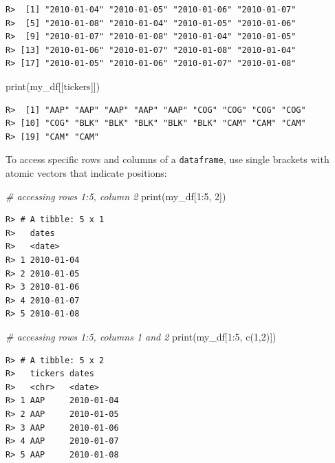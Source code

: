\documentclass[
  12pt,
]{book}
\newenvironment{Shaded}{\begin{snugshade}}{\end{snugshade}}
\newcommand{\CommentTok}[1]{\textcolor[rgb]{0.37,0.37,0.37}{\textit{#1}}}
\newcommand{\DecValTok}[1]{\textcolor[rgb]{0.06,0.06,0.06}{#1}}
\newcommand{\FunctionTok}[1]{\textcolor[rgb]{0,0,0}{#1}}
\newcommand{\NormalTok}[1]{#1}
\newcommand{\SpecialCharTok}[1]{\textcolor[rgb]{0,0,0}{#1}}
\newcommand{\StringTok}[1]{\textcolor[rgb]{0.5,0.5,0.5}{#1}}
\begin{document}
\begin{verbatim}
R>  [1] "2010-01-04" "2010-01-05" "2010-01-06" "2010-01-07"
R>  [5] "2010-01-08" "2010-01-04" "2010-01-05" "2010-01-06"
R>  [9] "2010-01-07" "2010-01-08" "2010-01-04" "2010-01-05"
R> [13] "2010-01-06" "2010-01-07" "2010-01-08" "2010-01-04"
R> [17] "2010-01-05" "2010-01-06" "2010-01-07" "2010-01-08"
\end{verbatim}

\begin{Shaded}
\begin{Highlighting}[]
\FunctionTok{print}\NormalTok{(my\_df[[}\StringTok{\textquotesingle{}tickers\textquotesingle{}}\NormalTok{]])}
\end{Highlighting}
\end{Shaded}

\begin{verbatim}
R>  [1] "AAP" "AAP" "AAP" "AAP" "AAP" "COG" "COG" "COG" "COG"
R> [10] "COG" "BLK" "BLK" "BLK" "BLK" "BLK" "CAM" "CAM" "CAM"
R> [19] "CAM" "CAM"
\end{verbatim}

To access specific rows and columns of a \texttt{dataframe}, use single brackets with atomic vectors that indicate positions:

\begin{Shaded}
\begin{Highlighting}[]
\CommentTok{\# accessing rows 1:5, column 2}
\FunctionTok{print}\NormalTok{(my\_df[}\DecValTok{1}\SpecialCharTok{:}\DecValTok{5}\NormalTok{, }\DecValTok{2}\NormalTok{])}
\end{Highlighting}
\end{Shaded}

\begin{verbatim}
R> # A tibble: 5 x 1
R>   dates     
R>   <date>    
R> 1 2010-01-04
R> 2 2010-01-05
R> 3 2010-01-06
R> 4 2010-01-07
R> 5 2010-01-08
\end{verbatim}

\begin{Shaded}
\begin{Highlighting}[]
\CommentTok{\# accessing rows 1:5, columns 1 and 2}
\FunctionTok{print}\NormalTok{(my\_df[}\DecValTok{1}\SpecialCharTok{:}\DecValTok{5}\NormalTok{, }\FunctionTok{c}\NormalTok{(}\DecValTok{1}\NormalTok{,}\DecValTok{2}\NormalTok{)])}
\end{Highlighting}
\end{Shaded}

\begin{verbatim}
R> # A tibble: 5 x 2
R>   tickers dates     
R>   <chr>   <date>    
R> 1 AAP     2010-01-04
R> 2 AAP     2010-01-05
R> 3 AAP     2010-01-06
R> 4 AAP     2010-01-07
R> 5 AAP     2010-01-08
\end{verbatim}
\end{document}
